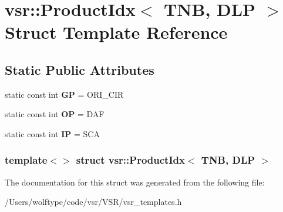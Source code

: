 \hypertarget{structvsr_1_1_product_idx_3_01_t_n_b_00_01_d_l_p_01_4}{\section{vsr\-:\-:Product\-Idx$<$ T\-N\-B, D\-L\-P $>$ Struct Template Reference}
\label{structvsr_1_1_product_idx_3_01_t_n_b_00_01_d_l_p_01_4}
}
\subsection*{Static Public Attributes}
\begin{DoxyCompactItemize}
\item 
\hypertarget{structvsr_1_1_product_idx_3_01_t_n_b_00_01_d_l_p_01_4_af9b71f4b9dcab10a2183def62770b822}{static const int {\bfseries G\-P} = O\-R\-I\-\_\-\-C\-I\-R}\label{structvsr_1_1_product_idx_3_01_t_n_b_00_01_d_l_p_01_4_af9b71f4b9dcab10a2183def62770b822}

\item 
\hypertarget{structvsr_1_1_product_idx_3_01_t_n_b_00_01_d_l_p_01_4_ad2cd282ce9093db4c5a9fe670bb1d59e}{static const int {\bfseries O\-P} = D\-A\-F}\label{structvsr_1_1_product_idx_3_01_t_n_b_00_01_d_l_p_01_4_ad2cd282ce9093db4c5a9fe670bb1d59e}

\item 
\hypertarget{structvsr_1_1_product_idx_3_01_t_n_b_00_01_d_l_p_01_4_a0051e778d4358a9991d005269d46dea6}{static const int {\bfseries I\-P} = S\-C\-A}\label{structvsr_1_1_product_idx_3_01_t_n_b_00_01_d_l_p_01_4_a0051e778d4358a9991d005269d46dea6}

\end{DoxyCompactItemize}
\subsubsection*{template$<$$>$ struct vsr\-::\-Product\-Idx$<$ T\-N\-B, D\-L\-P $>$}



The documentation for this struct was generated from the following file\-:\begin{DoxyCompactItemize}
\item 
/\-Users/wolftype/code/vsr/\-V\-S\-R/vsr\-\_\-templates.\-h\end{DoxyCompactItemize}
